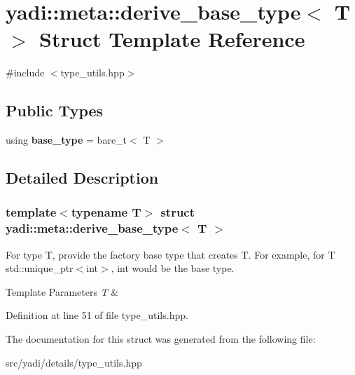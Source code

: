 \hypertarget{structyadi_1_1meta_1_1derive__base__type}{}\section{yadi\+:\+:meta\+:\+:derive\+\_\+base\+\_\+type$<$ T $>$ Struct Template Reference}
\label{structyadi_1_1meta_1_1derive__base__type}


{\ttfamily \#include $<$type\+\_\+utils.\+hpp$>$}

\subsection*{Public Types}
\begin{DoxyCompactItemize}
\item 
\mbox{\label{structyadi_1_1meta_1_1derive__base__type_a90b70b03e448a160fab74a151cd871a5}} 
using {\bfseries base\+\_\+type} = bare\+\_\+t$<$ T $>$
\end{DoxyCompactItemize}


\subsection{Detailed Description}
\subsubsection*{template$<$typename T$>$\newline
struct yadi\+::meta\+::derive\+\_\+base\+\_\+type$<$ T $>$}

For type T, provide the factory base type that creates T. For example, for T std\+::unique\+\_\+ptr$<$int$>$, int would be the base type. 
\begin{DoxyTemplParams}{Template Parameters}
{\em T} & \\
\hline
\end{DoxyTemplParams}


Definition at line 51 of file type\+\_\+utils.\+hpp.



The documentation for this struct was generated from the following file\+:\begin{DoxyCompactItemize}
\item 
src/yadi/details/type\+\_\+utils.\+hpp\end{DoxyCompactItemize}
